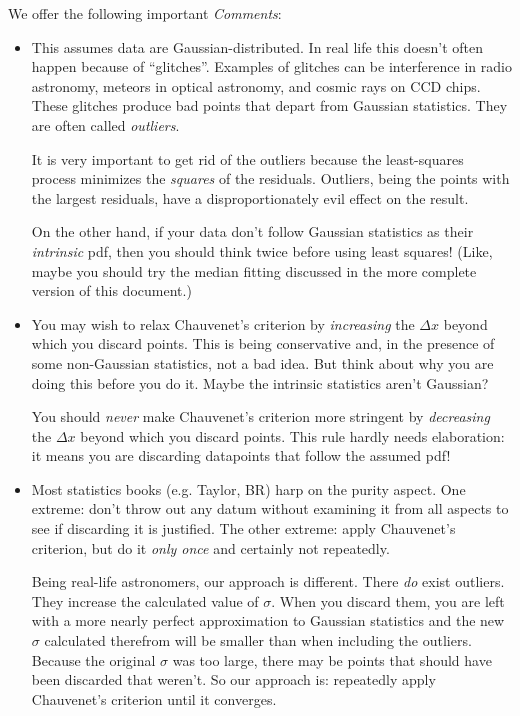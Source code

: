 \documentclass[psfig,preprint]{aastex}
\begin{document}
	We offer the following important {\it Comments}:
\begin{itemize}

	\item This assumes data are Gaussian-distributed. In real life
this doesn't often happen because of ``glitches''. Examples of glitches
can be interference in radio astronomy, meteors in optical astronomy,
and cosmic rays on CCD chips. These glitches produce bad points that
depart from Gaussian statistics. They are often called {\it outliers}.

	It is very important to get rid of the outliers because the
least-squares process minimizes the {\it squares} of the residuals.
Outliers, being the points with the largest residuals, have a
disproportionately evil effect on the result.

	On the other hand, if your data don't follow Gaussian statistics
as their {\it intrinsic} pdf, then you should think twice before using
least squares! (Like, maybe you should try the median fitting discussed in
the more complete version of this document.)

	\item You may wish to relax Chauvenet's criterion by {\it
increasing} the $\Delta x$ beyond which you discard points. This is
being conservative and, in the presence of some non-Gaussian statistics,
not a bad idea. But think about why you are doing this before you do it.
Maybe the intrinsic statistics aren't Gaussian?

	You should {\it never} make Chauvenet's criterion more stringent
by {\it decreasing} the $\Delta x$ beyond which you discard points. This
rule hardly needs elaboration: it means you are discarding datapoints
that follow the assumed pdf!

	\item Most statistics books (e.g. Taylor, BR) harp on the purity
aspect. One extreme: don't throw out any datum without examining it from all
aspects to see if discarding it is justified. The other extreme: apply
Chauvenet's criterion, but do it {\it only once} and certainly not
repeatedly.

	Being real-life astronomers, our approach is different. There
{\it do} exist outliers. They increase the calculated value of $\sigma$.
When you discard them, you are left with a more nearly perfect
approximation to Gaussian statistics and the new $\sigma$ calculated
therefrom will be smaller than when including the outliers. Because the
original $\sigma$ was too large, there may be points that should have
been discarded that weren't. So our approach is: repeatedly apply
Chauvenet's criterion until it converges. 


\end{itemize}
\end{document}
